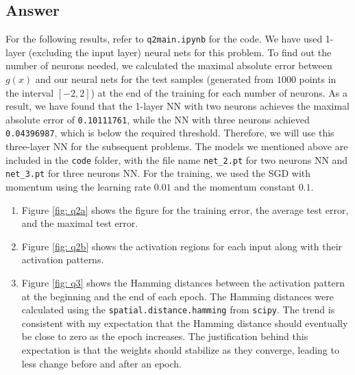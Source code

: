\documentclass[
	12pt, %
]{../Template/fphw}
\begin{document}
\subsection*{Answer}
For the following results, refer to \verb|q2main.ipynb| for the code. We have used 1-layer (excluding the input layer) neural nets for this problem. To find out the number of neurons needed, we calculated the maximal absolute error between $g(x)$ and our neural nets for the test samples (generated from $1000$ points in the interval $[-2,2]$) at the end of the training for each number of neurons. As a result, we have found that the 1-layer NN with two neurons achieves the maximal absolute error of \verb|0.10111761|, while the NN with three neurons achieved \verb|0.04396987|, which is below the required threshold. Therefore, we will use this three-layer NN for the subsequent problems. The models we mentioned above are included in the \verb|code| folder, with the file name \verb|net_2.pt| for two neurons NN and \verb|net_3.pt| for three neurons NN. For the training, we used the SGD with momentum using the learning rate $0.01$ and the momentum constant $0.1$.

\begin{enumerate}[label = (\alph*)]
	\item Figure \ref{fig: q2a} shows the figure for the training error, the average test error, and the maximal test error. 
    \item Figure \ref{fig: q2b} shows the activation regions for each input along with their activation patterns.
    \item Figure \ref{fig: q3} shows the Hamming distances between the activation pattern at the beginning and the end of each epoch. The Hamming distances were calculated using the \verb|spatial.distance.hamming| from \verb|scipy|. The trend is consistent with my expectation that the Hamming distance should eventually be close to zero as the epoch increases. The justification behind this expectation is that the weights should stabilize as they converge, leading to less change before and after an epoch.
\end{enumerate}
\end{document}
